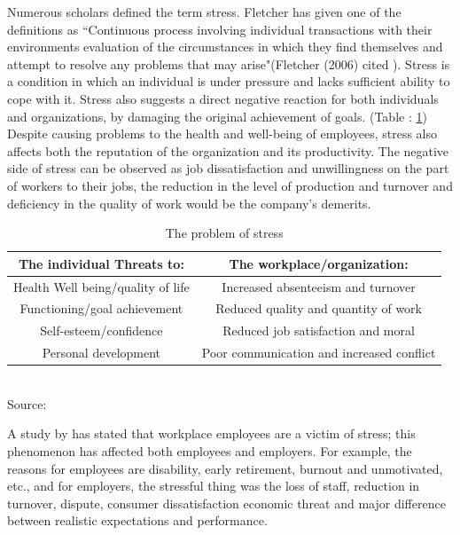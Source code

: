 Numerous scholars defined the term stress. Fletcher has given one of the definitions as  “Continuous process involving individual transactions with their environments evaluation of the circumstances in which they find themselves and attempt to resolve any problems that may arise"(Fletcher (2006) cited \citep{Rumbold2012APerformers.}). Stress is a condition in which an individual is under pressure and lacks sufficient ability to cope with it. Stress also suggests a direct negative reaction for both individuals and organizations, by damaging the original achievement of goals. (Table : \ref{tab:problem-stress}) Despite causing problems to the health and well-being of employees, stress also affects both the reputation of the organization and its productivity.  The negative side of stress can be observed as job dissatisfaction and unwillingness on the part of workers to their jobs, the reduction in the level of production and turnover and deficiency in the quality of work would be the company's demerits.

\begin{table}[ht!]
\centering
\caption[The problem of stress]{The problem of stress}
\begin{tabular}{|c|c|}
\hline
\textbf{The individual Threats to:} & \textbf{The workplace/organization:} \\ \hline
Health Well being/quality of life & Increased absenteeism and turnover \\ \hline
Functioning/goal achievement & Reduced quality and quantity of work \\ \hline
Self-esteem/confidence & Reduced job satisfaction and moral \\ \hline
Personal development & Poor communication and increased conflict \\ \hline
\end{tabular}\\
\footnotesize Source: \citep{Michie2002CausesWork.}
\label{tab:problem-stress}
\end{table}

A study by \citep{Michie2002CausesWork.} has stated that workplace employees are a victim of stress; this phenomenon has affected both employees and employers.  For example, the reasons for employees are disability, early retirement, burnout and unmotivated, etc., and for employers, the stressful thing was the loss of staff, reduction in turnover, dispute, consumer dissatisfaction economic threat and major difference between realistic expectations and performance.

